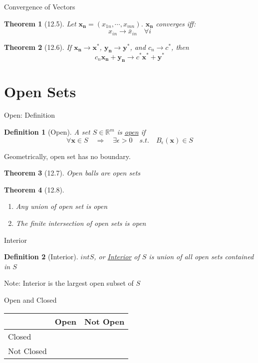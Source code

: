 \documentclass[a4paper,11pt]{article}
\newtheorem{defn}{Definition}
\newtheorem{thm}{Theorem}
\begin{document}
\begin{frame}[t]{Convergence of Vectors}
	\begin{thm}
		[12.5] Let $\mathbf{x_n}=(x_{1n},\cdots,x_{mn})$. $\mathbf{x_n}$ converges iff:
		\[
			x_{in} \rightarrow \bar x_{in} \quad \forall i
		\]
	\end{thm}
	\begin{thm}
		[12.6] If $\mathbf{x_n}\rightarrow\mathbf{x^\ast}$, $\mathbf{y_n} \rightarrow\mathbf{y^\ast}$, and $c_n\rightarrow c^\ast$, then\[
			c_n\mathbf{x_n}+\mathbf{y_n}\rightarrow c^\ast \mathbf{x^\ast} + \mathbf{y^\ast}
		\]
	\end{thm}
\end{frame}

\section{Open Sets} %
\label{sec:open_sets}
\begin{frame}[t]{Open: Definition}
	\begin{defn}
		[Open] A set $S\in\mathbb{R}^m$ is \uline{open} if \[
			\forall \mathbf{x}\in S \quad\Rightarrow\quad \exists \epsilon>0 \quad s.t.\quad B_\epsilon(\mathbf{x})\in S
		\]
	\end{defn}
	Geometrically, open set has no boundary.
	\begin{thm}
		[12.7] Open balls are open sets
	\end{thm}
	\begin{thm}[12.8]
		\begin{enumerate}
			\item Any union of open set is open
			\item The finite intersection of open sets is open
		\end{enumerate}
	\end{thm}
\end{frame}

\begin{frame}[t]{Interior}
	\begin{defn}
		[Interior]
		$int S$, or \uline{Interior} of $S$ is union of all open sets contained in $S$
	\end{defn}
	Note: Interior is the largest open subset of $S$
	\begin{block}
		{Open and Closed}
		\begin{center}
			\begin{tabular}{l|ll}
			& Open & Not Open\\
			\hline
			Closed &&\\
			Not Closed &&
			\end{tabular}
		\end{center}
	\end{block}
\end{frame}
\end{document}
